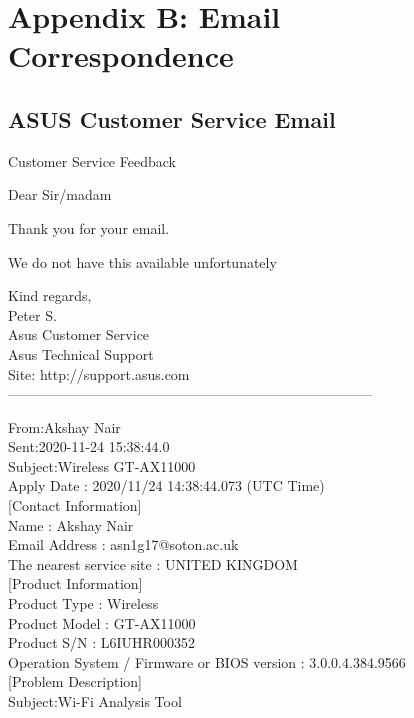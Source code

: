 \chapter{Appendix B: Email Correspondence} 

\section{ASUS Customer Service Email} \label{ASUSEmail}

{\selectfont
Customer Service Feedback


Dear Sir/madam



Thank you for your email.



We do not have this available unfortunately 






Kind regards,\\
Peter S.\\
Asus Customer Service\\
Asus Technical Support \\
Site: http://support.asus.com\\
------------------------------------------------------------------------------

From:Akshay Nair\\
Sent:2020-11-24 15:38:44.0\\
Subject:Wireless GT-AX11000\\
Apply Date : 2020/11/24 14:38:44.073 (UTC Time)\\

[Contact Information]\\
Name : Akshay Nair\\
Email Address : asn1g17@soton.ac.uk\\
The nearest service site : UNITED KINGDOM\\

[Product Information]\\
Product Type : Wireless\\
Product Model : GT-AX11000\\
Product S/N : L6IUHR000352\\
Operation System / Firmware or BIOS version : 3.0.0.4.384.9566\\

[Problem Description]\\
Subject:Wi-Fi Analysis Tool\\

}
